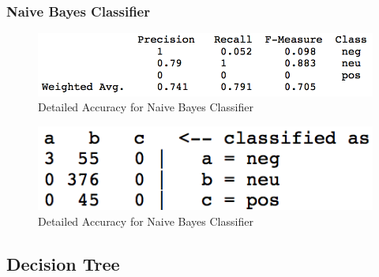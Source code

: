 \documentclass{beamer}
\begin{document}
\begin{frame}[fragile] %
\frametitle{Naive Bayes Classifier}

\begin{figure}[h]
\centering
\includegraphics[scale=0.4]{img/NBayes-Accuracy.png}
\caption{Detailed Accuracy for Naive Bayes Classifier}
\label{fig:NB-Acc}
\end{figure}

\begin{figure}[h]
\centering
\includegraphics[scale=0.4]{img/NBayes-Confusion.png}
\caption{Detailed Accuracy for Naive Bayes Classifier}
\label{fig:NB-Acc}
\end{figure}

\end{frame}

\subsection{Decision Tree}
\end{document}
